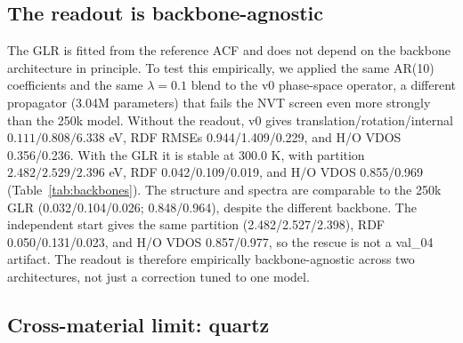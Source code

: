 

\subsection{The readout is backbone-agnostic}

The GLR is fitted from the reference ACF and does not depend on the backbone architecture in
principle. To test this empirically, we applied the same AR(10) coefficients and the same
\(\lambda=0.1\) blend to the v0 phase-space operator, a different propagator (3.04M parameters)
that fails the NVT screen even more strongly than the 250k model. Without the readout, v0 gives
translation/rotation/internal \(0.111/0.808/6.338\) eV, RDF RMSEs 0.944/1.409/0.229, and H/O VDOS
0.356/0.236. With the GLR it is stable at 300.0 K, with partition
\(2.482/2.529/2.396\) eV, RDF 0.042/0.109/0.019, and H/O VDOS 0.855/0.969 (Table~\ref{tab:backbones}).
The structure and spectra are comparable to the 250k GLR (0.032/0.104/0.026; 0.848/0.964), despite
the different backbone. The independent start gives the same partition (2.482/2.527/2.398), RDF
0.050/0.131/0.023, and H/O VDOS 0.857/0.977, so the rescue is not a val\_04 artifact. The readout
is therefore empirically backbone-agnostic across two architectures, not just a correction tuned
to one model.



\subsection{Cross-material limit: quartz}

